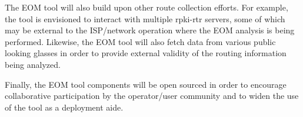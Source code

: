 The EOM tool will also build upon other route collection efforts. For
example, the tool is envisioned to interact with multiple rpki-rtr
servers, some of which may be external to the ISP/network operation
where the EOM analysis is being performed. Likewise, the EOM tool will
also fetch data from various public looking glasses in order to provide
external validity of the routing information being analyzed. 

Finally, the EOM tool components will be open sourced in order to
encourage collaborative participation by the operator/user community and
to widen the use of the tool as a deployment aide.
